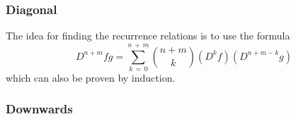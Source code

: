 \documentclass[12pt]{article}
\begin{document}
\subsubsection{Diagonal}

The idea for finding the recurrence relations is to use the formula
\begin{equation}
  D^{n+m}fg = \sum_{k\,=\,0}^{n\,+\,m}{n+m\choose k}(D^kf)(D^{n+m-k}g)
\end{equation}
which can also be proven by induction.
\subsubsection{Downwards}
%


\printbibliography
\end{document}
